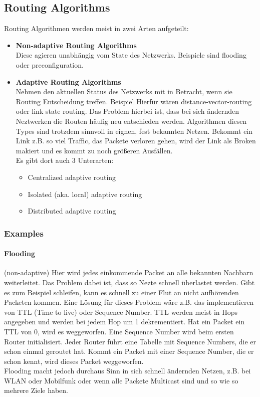 	\subsection{Routing Algorithms}
		Routing Algorithmen werden meist in zwei Arten aufgeteilt:
		\begin{itemize}
			\item \textbf{Non-adaptive Routing Algorithms} \\
				Diese agieren unabhängig vom State des Netzwerks. Beispiele sind flooding oder preconfiguration. 
			\item \textbf{Adaptive Routing Algorithms} \\
				Nehmen den aktuellen Status des Netzwerks mit in Betracht, wenn sie Routing Entscheidung treffen. Beispiel Hierfür wären distance-vector-routing oder link state routing. Das Problem hierbei ist, dass bei sich ändernden Neztwerken die Routen häufig neu entschieden werden. Algorithmen diesen Types sind trotzdem sinnvoll in eignen, fest bekannten Netzen. Bekommt ein Link z.B. so viel Traffic, das Packete verloren gehen, wird der Link als Broken makiert und es kommt zu noch größeren Ausfällen. \\
				Es gibt dort auch 3 Unterarten: 
				\begin{itemize}
					\item Centralized adaptive routing
					\item Isolated (aka. local) adaptive routing
					\item Distributed adaptive routing
				\end{itemize}
		\end{itemize}
		
		\subsubsection{Examples}
			\paragraph{Flooding}
				(non-adaptive) Hier wird jedes einkommende Packet an alle bekannten Nachbarn weiterleitet. Das Problem dabei ist, dass so Nezte schnell überlastet werden. Gibt es zum Beispiel schleifen, kann es schnell zu einer Flut an nicht aufhörenden Packeten kommen. Eine Lösung für dieses Problem wäre z.B. das implementieren von TTL (Time to live) oder Sequence Number. TTL werden meist in Hops angegeben und werden bei jedem Hop um 1 dekrementiert. Hat ein Packet ein TTL von 0, wird es weggeworfen. Eine Sequence Number wird beim ersten Router initialisiert. Jeder Router führt eine Tabelle mit Sequence Numbers, die er schon einmal geroutet hat. Kommt ein Packet mit einer Sequence Number, die er schon kennt, wird dieses Packet weggeworfen. \\
				Flooding macht jedoch durchaus Sinn in sich schnell ändernden Netzen, z.B. bei WLAN oder Mobilfunk oder wenn alle Packete Multicast sind und so wie so mehrere Ziele haben. 
			
